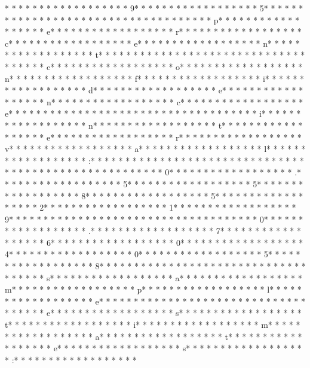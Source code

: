 * * *  * * *  * * *  *  * * *  *  * * *  * 9* * *  * * *  * * *  *  * * *  *  * * *  * 5* * *  * * *  * * *  *  * * *  *  * * *  *  * * *  * * *  * * *  *  * * *  *  * * *  * p* * *  * * *  * * *  *  * * *  *  * * *  * e* * *  * * *  * * *  *  * * *  *  * * *  * r* * *  * * *  * * *  *  * * *  *  * * *  * c* * *  * * *  * * *  *  * * *  *  * * *  * e* * *  * * *  * * *  *  * * *  *  * * *  * n* * *  * * *  * * *  *  * * *  *  * * *  * t* * *  * * *  * * *  *  * * *  *  * * *  *  * * *  * * *  * * *  *  * * *  *  * * *  * c* * *  * * *  * * *  *  * * *  *  * * *  * o* * *  * * *  * * *  *  * * *  *  * * *  * n* * *  * * *  * * *  *  * * *  *  * * *  * f* * *  * * *  * * *  *  * * *  *  * * *  * i* * *  * * *  * * *  *  * * *  *  * * *  * d* * *  * * *  * * *  *  * * *  *  * * *  * e* * *  * * *  * * *  *  * * *  *  * * *  * n* * *  * * *  * * *  *  * * *  *  * * *  * c* * *  * * *  * * *  *  * * *  *  * * *  * e* * *  * * *  * * *  *  * * *  *  * * *  *  * * *  * * *  * * *  *  * * *  *  * * *  * i* * *  * * *  * * *  *  * * *  *  * * *  * n* * *  * * *  * * *  *  * * *  *  * * *  * t* * *  * * *  * * *  *  * * *  *  * * *  * e* * *  * * *  * * *  *  * * *  *  * * *  * r* * *  * * *  * * *  *  * * *  *  * * *  * v* * *  * * *  * * *  *  * * *  *  * * *  * a* * *  * * *  * * *  *  * * *  *  * * *  * l* * *  * * *  * * *  *  * * *  *  * * *  * :* * *  * * *  * * *  *  * * *  *  * * *  * 
* * *  * * *  * * *  *  * * *  *  * * *  *  * * *  * * *  * * *  *  * * *  *  * * *  * 0* * *  * * *  * * *  *  * * *  *  * * *  * .* * *  * * *  * * *  *  * * *  *  * * *  * 5* * *  * * *  * * *  *  * * *  *  * * *  * 5* * *  * * *  * * *  *  * * *  *  * * *  * 8* * *  * * *  * * *  *  * * *  *  * * *  * 5* * *  * * *  * * *  *  * * *  *  * * *  * 2* * *  * * *  * * *  *  * * *  *  * * *  * 1* * *  * * *  * * *  *  * * *  *  * * *  * 9* * *  * * *  * * *  *  * * *  *  * * *  *  * * *  * * *  * * *  *  * * *  *  * * *  * 0* * *  * * *  * * *  *  * * *  *  * * *  * .* * *  * * *  * * *  *  * * *  *  * * *  * 7* * *  * * *  * * *  *  * * *  *  * * *  * 6* * *  * * *  * * *  *  * * *  *  * * *  * 0* * *  * * *  * * *  *  * * *  *  * * *  * 4* * *  * * *  * * *  *  * * *  *  * * *  * 0* * *  * * *  * * *  *  * * *  *  * * *  * 5* * *  * * *  * * *  *  * * *  *  * * *  * 8* * *  * * *  * * *  *  * * *  *  * * *  * 
* * *  * * *  * * *  *  * * *  *  * * *  * s* * *  * * *  * * *  *  * * *  *  * * *  * a* * *  * * *  * * *  *  * * *  *  * * *  * m* * *  * * *  * * *  *  * * *  *  * * *  * p* * *  * * *  * * *  *  * * *  *  * * *  * l* * *  * * *  * * *  *  * * *  *  * * *  * e* * *  * * *  * * *  *  * * *  *  * * *  *  * * *  * * *  * * *  *  * * *  *  * * *  * e* * *  * * *  * * *  *  * * *  *  * * *  * s* * *  * * *  * * *  *  * * *  *  * * *  * t* * *  * * *  * * *  *  * * *  *  * * *  * i* * *  * * *  * * *  *  * * *  *  * * *  * m* * *  * * *  * * *  *  * * *  *  * * *  * a* * *  * * *  * * *  *  * * *  *  * * *  * t* * *  * * *  * * *  *  * * *  *  * * *  * e* * *  * * *  * * *  *  * * *  *  * * *  * s* * *  * * *  * * *  *  * * *  *  * * *  * :* * *  * * *  * * *  *  * * *  *  * * *  * 
